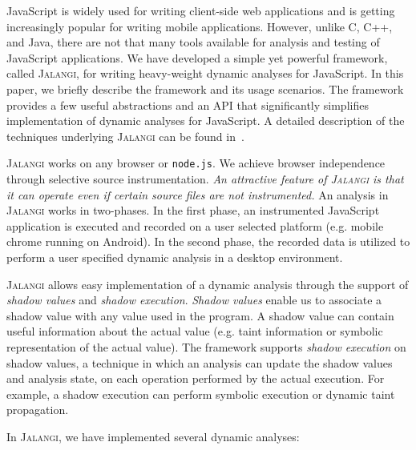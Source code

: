 \documentclass{sig-alternate}
\def\jalangi{\textsc{Jalangi}}
\begin{document}
JavaScript is widely used for writing client-side web applications and
is getting increasingly popular for writing mobile applications.
However, unlike C, C++, and Java, there are not that many tools
available for analysis and testing of JavaScript applications.  We
have developed a simple yet powerful framework, called \jalangi{}, for
writing heavy-weight dynamic analyses for JavaScript.  In this paper,
we briefly describe the framework and its usage scenarios.  The
framework provides a few useful abstractions and an API that
significantly simplifies implementation of dynamic analyses for
JavaScript.  A detailed description of the techniques underlying
\jalangi{} can be found in~\cite{SBGKfse13}.

\jalangi{} works on any browser or \texttt{node.js}.  We achieve
browser independence through selective source
instrumentation. \emph{An attractive feature of \jalangi{} is that it
  can operate even if certain source files are not instrumented.}  An
analysis in \jalangi{} works in two-phases.  In the first phase, an
instrumented JavaScript application is executed and recorded on a user
selected platform (e.g. mobile chrome running on Android).  In the
second phase, the recorded data is utilized to perform a user
specified dynamic analysis in a desktop environment.

\jalangi{} allows easy implementation of a dynamic analysis through
the support of \emph{shadow values} and \emph{shadow execution}.
\emph{Shadow values} enable us to associate a shadow value with any
value used in the program.  A shadow value can contain useful
information about the actual value (e.g. taint information or symbolic
representation of the actual value).  The framework supports
\emph{shadow execution} on shadow values, a technique in which an
analysis can update the shadow values and analysis state, on each
operation performed by the actual execution.  For example, a shadow
execution can perform symbolic execution or dynamic taint propagation.

In \jalangi{}, we have implemented several dynamic analyses:
\end{document}
